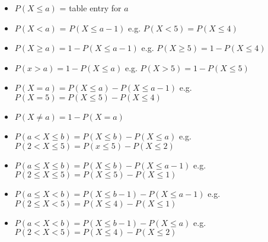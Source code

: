 \documentclass{report}
\begin{document}
\begin{mdframed}
  
\begin{itemize}[label=$\bullet$]
  \item $P(X \le a)$ = table entry for $a$
  \bigbreak
  \item $P(X < a)$ = $P(X \le a - 1)$ \hspace{39mm} e.g. $P(X < 5) = P(X \le 4)$
  \bigbreak
  \item $P(X \ge a) = 1 - P(X \le a -1)$ \hspace{33.5mm} e.g. $P(X \ge 5) = 1 - P(X \le 4)$
  \bigbreak
  \item $P(x > a) = 1 - P(X \le a)$ \hspace{41mm} e.g. $P(X > 5) = 1 - P(X \le 5)$
  \bigbreak
  \item $P(X = a) = P(X \le a) - P(X \le a - 1)$ \hspace{20mm} e.g. $P(X = 5) = P(X \le 5) - P(X \le 4)$
  \bigbreak
  \item $P(X \neq a) = 1-P(X = a)$ 
  \bigbreak
  \item $P(a < X \le b) = P(X \le b) - P(X \le a)$ \hspace{21mm} e.g. $ P(2 < X \le 5) = P(x \le 5) - P(X \le 2)$
  \bigbreak
  \item $P(a \le X \le b) = P(X \le b) - P(X \le a - 1)$ \hspace{15.5mm} e.g. $P(2 \le X \le 5) = P(X \le 5) - P(X \le 1)$
  \bigbreak
  \item $P(a \le X < b) = P(X \le b- 1) - P(X \le a -1)$ \hspace{10mm} e.g. $P(2 \le X < 5) = P(X \le 4) - P(X \le 1)$
  \bigbreak
  \item $P(a < X < b) = P(X \le b - 1) - P(X \le a)$ \hspace{16mm} e.g. $P(2 < X < 5 ) = P(X \le 4) - P(X \le 2)$
\end{itemize}
\end{mdframed}
\end{document}
